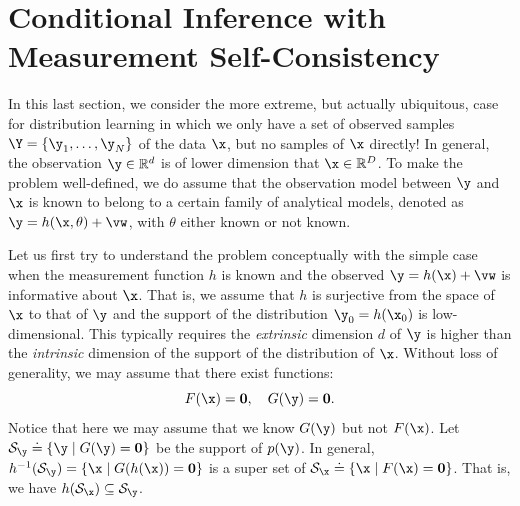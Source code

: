 \documentclass[../../book-main.tex]{subfiles}
\begin{document}



\section{Conditional Inference with Measurement Self-Consistency}
\label{sec:measurement-self-consistency}
In this last section, we consider the more extreme, but actually ubiquitous, case for distribution learning in which we only have a set of observed samples $\Y = \{\y_1,\ldots, \y_N\}$ of the data $\x$, but no samples of $\x$ directly! In general, the observation $\y \in \mathbb{R}^d$ is of lower dimension that $\x \in \mathbb{R}^D$. To make the problem well-defined, we do assume that the observation model between $\y$ and $\x$ is known to belong to a certain family of analytical models, denoted as $\y = h(\x, \theta) +\vw$, with $\theta$ either known or not known. 

Let us first try to understand the problem conceptually with the simple case when the measurement function $h$ is known and the observed $\y = h(\x) + \vw$ is informative about $\x$. That is, we assume that $h$ is surjective from the space of $\x$ to that of $\y$ and the support of the distribution $\y_0 = h(\x_0)$ is low-dimensional. This typically requires the \textit{extrinsic} dimension $d$ of $\y$ is higher than the \textit{intrinsic} dimension of the support of the distribution of $\x$. Without loss of generality, we may assume that there exist functions:
\begin{equation}
F(\x) = \boldsymbol{0},\quad     G(\y) = \boldsymbol{0}.
\end{equation}
Notice that here we may assume that we know $G(\y)$ but not $F(\x)$. Let $\mathcal{S}_{\y} \doteq \{\y \mid G(\y) = \boldsymbol{0}\}$ be the support of $p(\y)$.  In general, $h^{-1}(\mathcal{S}_{\y}) = \{\x \mid G(h(\x)) = \boldsymbol{0}\}$ is a super set of $\mathcal{S}_{\x} \doteq \{\x \mid F(\x) = \boldsymbol{0}\}$. That is, we have $h(\mathcal{S}_{\x}) \subseteq \mathcal{S}_{\y}$.
\end{document}
